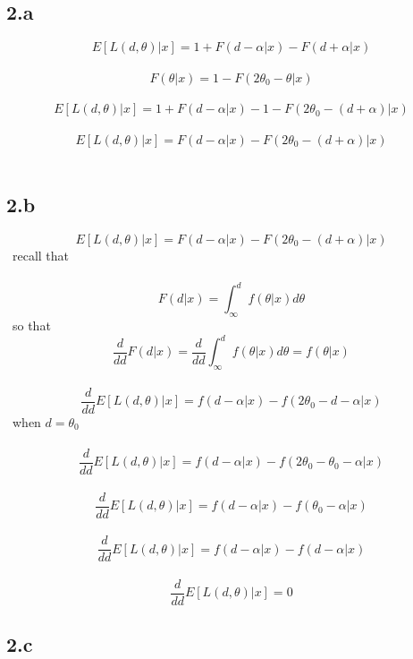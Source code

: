 \documentclass[11pt]{article}   	%
\begin{document}
\subsection*{2.a}

\[ E[L(d, \theta) | x] = 1 + F(d - \alpha | x) - F(d + \alpha | x) \] 
\
\[ F(\theta | x) = 1 - F(2 \theta_0 - \theta | x) \]
\
\[ E[L(d, \theta) | x] = 1 + F (d - \alpha | x) - 1 - F(2 \theta_0 - (d + \alpha) | x) \] 
\
\[ E[L(d, \theta) | x] = F (d - \alpha | x) - F(2 \theta_0 - (d + \alpha) | x) \]
\


\subsection*{2.b}

\[ E[L(d, \theta) | x] = F (d - \alpha | x) - F(2 \theta_0 - (d + \alpha) | x) \]
\
recall that \\
\
\[ F(d|x) = \int_{\infty}^d f(\theta | x) d \theta \]
\
so that \
\
\[ \frac{d}{dd} F(d|x) = \frac{d}{dd} \int_{\infty}^d f(\theta | x) d \theta = f(\theta|x) \]
\
\[ \frac{d}{dd} E[ L(d, \theta) | x ] = f(d - \alpha | x) - f( 2 \theta_0 - d - \alpha | x) \]
\
when $ d = \theta_0 $ \\
\
\[ \frac{d}{dd} E[ L(d, \theta) | x ] = f(d - \alpha | x) - f( 2 \theta_0 - \theta_0 - \alpha | x) \]
\
\[ \frac{d}{dd} E[ L(d, \theta) | x ] = f(d - \alpha | x) - f( \theta_0 - \alpha | x) \]
\
\[ \frac{d}{dd} E[ L(d, \theta) | x ] = f(d - \alpha | x) - f( d - \alpha | x) \]
\
\[ \frac{d}{dd} E[ L(d, \theta) | x ]  = 0 \]


\subsection*{2.c}
\end{document}
